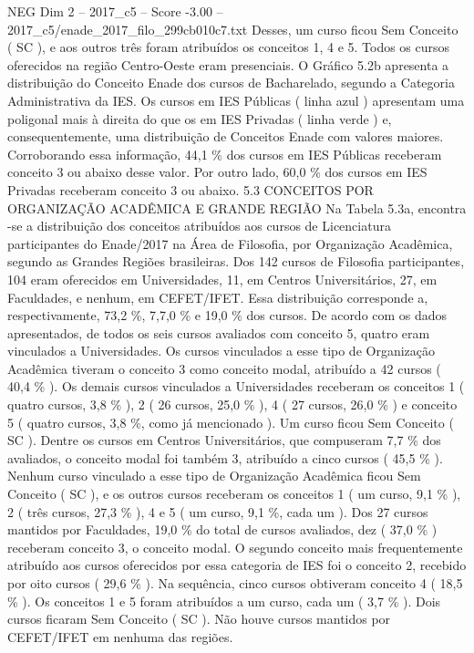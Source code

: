 \begin{textsample}{NEG Dim 2 – 2017\_c5 – Score -3.00 – 2017\_c5/enade\_2017\_filo\_299cb010c7.txt}
Desses, um curso ficou Sem Conceito ( SC ), e aos outros três foram atribuídos os conceitos 1, 4 e 5.
Todos os cursos oferecidos na região Centro-Oeste eram presenciais.
O Gráfico 5.2b apresenta a distribuição do Conceito Enade dos cursos de Bacharelado, segundo a Categoria Administrativa da IES.
Os cursos em IES Públicas ( linha azul ) apresentam uma poligonal mais à direita do que os em IES Privadas ( linha verde ) e, consequentemente, uma distribuição de Conceitos Enade com valores maiores.
Corroborando essa informação, 44,1 \% dos cursos em IES Públicas receberam conceito 3 ou abaixo desse valor.
Por outro lado, 60,0 \% dos cursos em IES Privadas receberam conceito 3 ou abaixo. 5.3 CONCEITOS POR ORGANIZAÇÃO ACADÊMICA E GRANDE REGIÃO Na Tabela 5.3a, encontra -se a distribuição dos conceitos atribuídos aos cursos de Licenciatura participantes do Enade/2017 na Área de Filosofia, por Organização Acadêmica, segundo as Grandes Regiões brasileiras.
Dos 142 cursos de Filosofia participantes, 104 eram oferecidos em Universidades, 11, em Centros Universitários, 27, em Faculdades, e nenhum, em CEFET/IFET.
Essa distribuição corresponde a, respectivamente, 73,2 \%, 7,7,0 \% e 19,0 \% dos cursos.
De acordo com os dados apresentados, de todos os seis cursos avaliados com conceito 5, quatro eram vinculados a Universidades.
Os cursos vinculados a esse tipo de Organização Acadêmica tiveram o conceito 3 como conceito modal, atribuído a 42 cursos ( 40,4 \% ).
Os demais cursos vinculados a Universidades receberam os conceitos 1 ( quatro cursos, 3,8 \% ), 2 ( 26 cursos, 25,0 \% ), 4 ( 27 cursos, 26,0 \% ) e conceito 5 ( quatro cursos, 3,8 \%, como já mencionado ).
Um curso ficou Sem Conceito ( SC ).
Dentre os cursos em Centros Universitários, que compuseram 7,7 \% dos avaliados, o conceito modal foi também 3, atribuído a cinco cursos ( 45,5 \% ).
Nenhum curso vinculado a esse tipo de Organização Acadêmica ficou Sem Conceito ( SC ), e os outros cursos receberam os conceitos 1 ( um curso, 9,1 \% ), 2 ( três cursos, 27,3 \% ), 4 e 5 ( um curso, 9,1 \%, cada um ).
Dos 27 cursos mantidos por Faculdades, 19,0 \% do total de cursos avaliados, dez ( 37,0 \% ) receberam conceito 3, o conceito modal.
O segundo conceito mais frequentemente atribuído aos cursos oferecidos por essa categoria de IES foi o conceito 2, recebido por oito cursos ( 29,6 \% ).
Na sequência, cinco cursos obtiveram conceito 4 ( 18,5 \% ).
Os conceitos 1 e 5 foram atribuídos a um curso, cada um ( 3,7 \% ).
Dois cursos ficaram Sem Conceito ( SC ).
Não houve cursos mantidos por CEFET/IFET em nenhuma das regiões.

\end{textsample}

